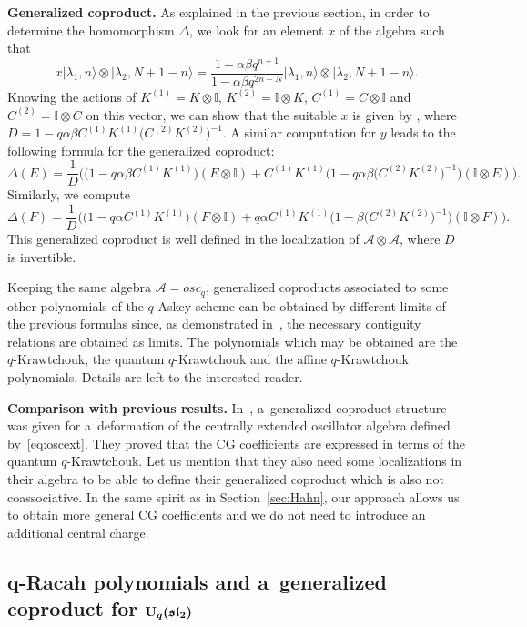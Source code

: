 \documentclass[pdftex]{sigma}
\numberwithin{equation}{section}
\theoremstyle{definition}
\begin{document}
{\bf Generalized coproduct.} As explained in the previous section, in order to determine the homomorphism $\Delta$, we look for an element $x$ of the algebra such that
\[
 x|\lambda_1,n\rangle\otimes |\lambda_2,N+1-n\rangle=\frac{1-\alpha\beta q^{n+1}}{1-\alpha\beta q^{2n-N}}|\lambda_1,n\rangle\otimes |\lambda_2,N+1-n\rangle.
\]
Knowing the actions of $K^{(1)}=K\otimes \mathbb{I}$, $K^{(2)}=\mathbb{I} \otimes K$, $C^{(1)}=C\otimes \mathbb{I}$ and $C^{(2)}=\mathbb{I} \otimes C$ on this vector, we can show that the suitable $x$ is given by
,
where $D=1-q\alpha\beta C^{(1)}K^{(1)}\bigl(C^{(2)}K^{(2)}\bigr)^{-1}$.
A similar computation for $y$ leads to the following formula for the generalized coproduct:
\[
 \Delta(E)=\frac{1}{D}\bigl(\bigl(1-q\alpha\beta C^{(1)}K^{(1)}\bigr)(E\otimes \mathbb{I})+C^{(1)}K^{(1)}\bigl(1-q\alpha\beta \bigl(C^{(2)}K^{(2)}\bigr)^{-1}\bigr)(\mathbb{I}\otimes E)\bigr).
\]
Similarly, we compute
\[
\Delta(F)=\frac{1}{D}\bigl(\bigl(1-q\alpha C^{(1)}K^{(1)}\bigr)(F\otimes \mathbb{I})+q\alpha C^{(1)}K^{(1)} \bigl(1-\beta \bigl(C^{(2)}K^{(2)}\bigr)^{-1}\bigr)(\mathbb{I}\otimes F)\bigr).\]
This generalized coproduct is well defined in the localization of $\mathcal{A}\otimes \mathcal{A}$, where $D$
is invertible.


Keeping the same algebra $\mathcal{A}=osc_q$, generalized coproducts associated to some other polynomials of the $q$-Askey scheme can be obtained by different limits of the previous formulas since, as demonstrated in~\cite{contiguity}, the necessary contiguity relations are obtained as limits. The polynomials which may be obtained are the $q$-Krawtchouk, the quantum $q$-Krawtchouk and the affine $q$-Krawtchouk polynomials. Details are left to the interested reader.

{\bf Comparison with previous results.} In~\cite{KMM92}, a~generalized coproduct structure was given for a~deformation of the centrally extended oscillator algebra defined by~\eqref{eq:oscext}. They proved that the CG coefficients are expressed in terms of the quantum $q$-Krawtchouk. Let us mention that they also need some localizations in their algebra to be able to define their generalized coproduct which is also not coassociative. In the same spirit as in Section~\ref{sec:Hahn}, our approach allows us to obtain more general CG coefficients and we do not need to introduce an additional central charge.

\subsection[q-Racah polynomials and a~generalized coproduct for U\_q(sl\_2)]{$\boldsymbol{q}$-Racah polynomials and a~generalized coproduct for $\boldsymbol{{\rm U}_q(\mathfrak{sl}_2)}$} \label{eq:coqr}
\end{document}

